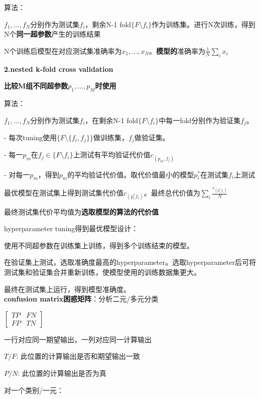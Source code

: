 \documentclass[UTF8]{ctexart}
\begin{document}
  \quad \quad 算法：

  \quad \quad \quad $f_1, ..., f_N$分别作为测试集$f_i$，剩余N-1 fold$\{F\setminus f_i\}$作为训练集。进行N次训练，得到N个\textbf{同一超参数}产生的训练结果
  
  \quad \quad \quad N个训练后模型在对应测试集准确率为${x_1, ..., x_N}$。\textbf{模型的}准确率为$\frac{1}{N}\sum_ix_i$

  \quad \textbf{2.nested k-fold cross validation}

  \quad \quad \textbf{比较M组不同超参数$p_1, ..., p_M$时使用}

  \quad \quad 算法：
  
  \quad \quad \quad $f_1, ..., f_N$分别作为测试集$f_i$，在剩余N-1 fold$\{F\setminus f_i\}$中每一fold分别作为验证集$f_j$。

  \quad \quad \quad - 每次tuning使用$\{F\setminus \{f_i, f_j\}\}$做训练集，$f_j$做验证集。

  \quad \quad \quad - 每一$p_m$在$f_j \in \{F \setminus f_i\}$上测试有平均验证代价值$c_{(p_m, f_j)}$

  \quad \quad \quad - 对每一$p_m$，得到$p_m$的平均验证代价值。取代价值最小的模型$p^*_i$在测试集$f_i$上测试

  \quad \quad \quad 最优模型在测试集上得到测试集代价值$c_{(p^*_i f_i)}$。最终总代价值为$\sum_i\frac{c_{(p^*_i f_i)} }{N}$

  \quad \quad \quad 最终测试集代价平均值为\textbf{选取模型的算法的代价值}

  hyperparameter tuning得到最优模型设计：
  
  \quad 使用不同超参数在训练集上训练，得到多个训练结束的模型。
  
  \quad 在验证集上测试，选取准确度最高的hyperparameter。选取hyperparameter后可将测试集和验证集合并重新训练，使模型使用的训练数据集更大。
  
  \quad 最终在测试集上运行，得到模型准确度。\\
\textbf{confusion matrix困惑矩阵}：分析二元/多元分类
  
  $\begin{bmatrix}
    TP & FN \\
    FP & TN
  \end{bmatrix}$

  一行对应同一期望输出，一列对应同一计算输出

  $T/F$: 此位置的计算输出是否和期望输出一致

  $P/N$: 此位置的计算输出是否为真

  对一个类别/一元：
\end{document}
